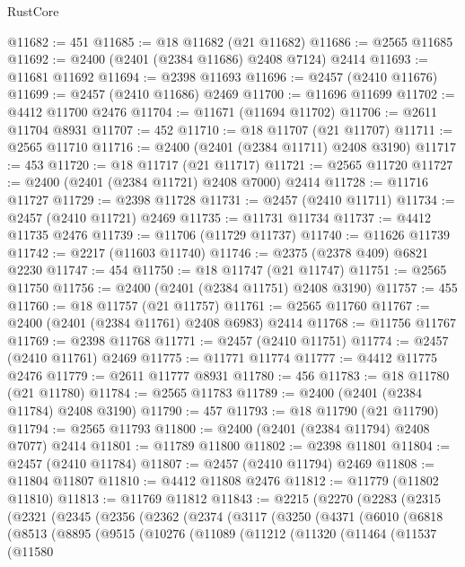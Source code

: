 \begin{lexlean}{RustCore}
\begin{coremodule}
@11682 := 451
@11685 := @18 @11682 (@21 @11682)
@11686 := @2565 @11685
@11692 := @2400 (@2401 (@2384 @11686) @2408 @7124) @2414
@11693 := @11681 @11692
@11694 := @2398 @11693
@11696 := @2457 (@2410 @11676)
@11699 := @2457 (@2410 @11686) @2469
@11700 := @11696 @11699
@11702 := @4412 @11700 @2476
@11704 := @11671 (@11694 @11702)
@11706 := @2611 @11704 @8931
@11707 := 452
@11710 := @18 @11707 (@21 @11707)
@11711 := @2565 @11710
@11716 := @2400 (@2401 (@2384 @11711) @2408 @3190)
@11717 := 453
@11720 := @18 @11717 (@21 @11717)
@11721 := @2565 @11720
@11727 := @2400 (@2401 (@2384 @11721) @2408 @7000) @2414
@11728 := @11716 @11727
@11729 := @2398 @11728
@11731 := @2457 (@2410 @11711)
@11734 := @2457 (@2410 @11721) @2469
@11735 := @11731 @11734
@11737 := @4412 @11735 @2476
@11739 := @11706 (@11729 @11737)
@11740 := @11626 @11739
@11742 := @2217 (@11603 @11740)
@11746 := @2375 (@2378 @409) @6821 @2230
@11747 := 454
@11750 := @18 @11747 (@21 @11747)
@11751 := @2565 @11750
@11756 := @2400 (@2401 (@2384 @11751) @2408 @3190)
@11757 := 455
@11760 := @18 @11757 (@21 @11757)
@11761 := @2565 @11760
@11767 := @2400 (@2401 (@2384 @11761) @2408 @6983) @2414
@11768 := @11756 @11767
@11769 := @2398 @11768
@11771 := @2457 (@2410 @11751)
@11774 := @2457 (@2410 @11761) @2469
@11775 := @11771 @11774
@11777 := @4412 @11775 @2476
@11779 := @2611 @11777 @8931
@11780 := 456
@11783 := @18 @11780 (@21 @11780)
@11784 := @2565 @11783
@11789 := @2400 (@2401 (@2384 @11784) @2408 @3190)
@11790 := 457
@11793 := @18 @11790 (@21 @11790)
@11794 := @2565 @11793
@11800 := @2400 (@2401 (@2384 @11794) @2408 @7077) @2414
@11801 := @11789 @11800
@11802 := @2398 @11801
@11804 := @2457 (@2410 @11784)
@11807 := @2457 (@2410 @11794) @2469
@11808 := @11804 @11807
@11810 := @4412 @11808 @2476
@11812 := @11779 (@11802 @11810)
@11813 := @11769 @11812
@11843 := @2215
    (@2270
      (@2283
        (@2315
          (@2321
            (@2345
              (@2356
                (@2362
                  (@2374
                    (@3117
                      (@3250
                        (@4371
                          (@6010
                            (@6818
                              (@8513
                                (@8895
                                  (@9515
                                    (@10276
                                      (@11089
                                        (@11212
                                          (@11320
                                            (@11464
                                              (@11537
                                                (@11580

\end{coremodule}
\end{lexlean}
